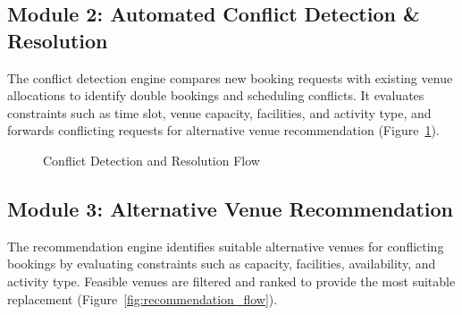 \documentclass[12pt, a4paper, oneside]{report}
\begin{document}
\subsection{Module 2: Automated Conflict Detection \& Resolution}

The conflict detection engine compares new booking requests with existing venue allocations to identify double bookings and scheduling conflicts. It evaluates constraints such as time slot, venue capacity, facilities, and activity type, and forwards conflicting requests for alternative venue recommendation (Figure~\ref{fig:conflict_flow}).

\begin{figure}[H]
\centering
{}
\caption{Conflict Detection and Resolution Flow}
\label{fig:conflict_flow}
\end{figure}

\subsection{Module 3: Alternative Venue Recommendation}

The recommendation engine identifies suitable alternative venues for conflicting bookings by evaluating constraints such as capacity, facilities, availability, and activity type. Feasible venues are filtered and ranked to provide the most suitable replacement (Figure~\ref{fig:recommendation_flow}).
\end{document}
